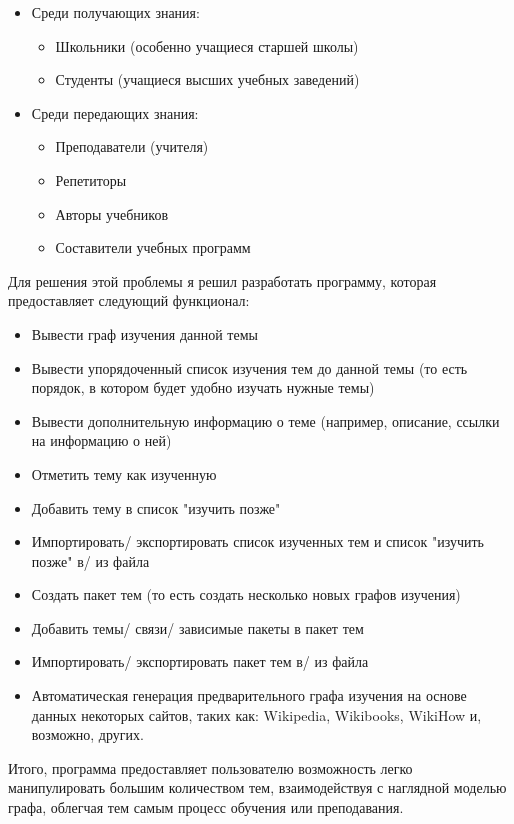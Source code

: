 \documentclass[a4paper,14pt]{extarticle}
\begin{document}
\begin{itemize}
    \item Среди получающих знания:
    \begin{itemize}
        \item Школьники (особенно учащиеся старшей школы)
        \item Студенты (учащиеся высших учебных заведений)
    \end{itemize}

    \item Среди передающих знания:
    \begin{itemize}
        \item Преподаватели (учителя)
        \item Репетиторы
        \item Авторы учебников
        \item Составители учебных программ
    \end{itemize}
\end{itemize}

Для решения этой проблемы я решил разработать программу, которая предоставляет следующий функционал:

\begin{itemize}
\item Вывести граф изучения данной темы
\item Вывести упорядоченный список изучения тем до данной темы (то есть порядок,
  в котором будет удобно изучать нужные темы)
\item Вывести дополнительную информацию о теме (например, описание, ссылки на информацию о ней)
\item Отметить тему как изученную
\item Добавить тему в список "изучить позже"
\item Импортировать/ экспортировать список изученных тем и список "изучить позже" в/ из файла
\item Создать пакет тем (то есть создать несколько новых графов изучения)
\item Добавить темы/ связи/ зависимые пакеты в пакет тем
\item Импортировать/ экспортировать пакет тем в/ из файла
\item Автоматическая генерация предварительного графа изучения на основе данных некоторых
    сайтов, таких как: Wikipedia, Wikibooks, WikiHow и, возможно, других.
\end{itemize}

Итого, программа предоставляет пользователю возможность легко
манипулировать большим количеством тем, взаимодействуя с наглядной моделью графа,
облегчая тем самым процесс обучения или преподавания.
\end{document}
